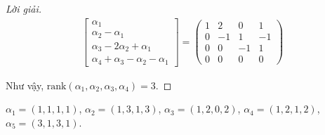 \documentclass[class=linear-algebra,crop=false]{standalone}
\begin{document}
\begin{proof}[Lời giải]
\begin{align*}
\begin{bmatrix}
            \alpha_{1}                            \\
            \alpha_{2} - \alpha_{1}               \\
            \alpha_{3} - 2\alpha_{2} + \alpha_{1} \\
            \alpha_{4} + \alpha_{3} -\alpha_{2} - \alpha_{1}
        \end{bmatrix}=
        \begin{pmatrix}
            1 & 2  & 0  & 1  \\
            0 & -1 & 1  & -1 \\
            0 & 0  & -1 & 1  \\
            0 & 0  & 0  & 0
        \end{pmatrix}
    \end{align*}
    \par Như vậy, $\text{rank}(\alpha_{1},\alpha_{2},\alpha_{3},\alpha_{4}) = 3$.
\end{proof}

\begin{exercise}
    $\alpha_{1} = (1,1,1,1)$, $\alpha_{2} = (1,3,1,3)$, $\alpha_{3} = (1,2,0,2)$, $\alpha_{4} = (1,2,1,2)$, $\alpha_{5} = (3,1,3,1)$.
\end{exercise}
\end{document}
